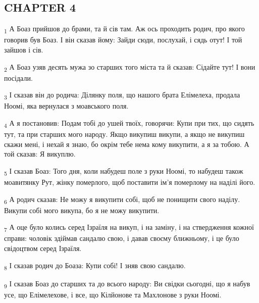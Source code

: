 \subsection{CHAPTER 4}
\begin{tcolorbox}
\textsubscript{1} А Боаз прийшов до брами, та й сів там. Аж ось проходить родич, про якого говорив був Боаз. І він сказав йому: Зайди сюди, послухай, і сядь отут! І той зайшов і сів.
\end{tcolorbox}
\begin{tcolorbox}
\textsubscript{2} А Боаз узяв десять мужа зо старших того міста та й сказав: Сідайте тут! І вони посідали.
\end{tcolorbox}
\begin{tcolorbox}
\textsubscript{3} І сказав він до родича: Ділянку поля, що нашого брата Елімелеха, продала Ноомі, яка вернулася з моавського поля.
\end{tcolorbox}
\begin{tcolorbox}
\textsubscript{4} А я постановив: Подам тобі до ушей твоїх, говорячи: Купи при тих, що сидять тут, та при старших мого народу. Якщо викупиш викупи, а якщо не викупиш скажи мені, і нехай я знаю, бо окрім тебе нема кому викупити, а я за тобою. А той сказав: Я викуплю.
\end{tcolorbox}
\begin{tcolorbox}
\textsubscript{5} І сказав Боаз: Того дня, коли набудеш поле з руки Ноомі, то набудеш також моавитянку Рут, жінку померлого, щоб поставити ім'я померлому на наділі його.
\end{tcolorbox}
\begin{tcolorbox}
\textsubscript{6} А родич сказав: Не можу я викупити собі, щоб не понищити свого наділу. Викупи собі мого викупа, бо я не можу викупити.
\end{tcolorbox}
\begin{tcolorbox}
\textsubscript{7} А оце було колись серед Ізраїля на викуп, і на заміну, і на ствердження кожної справи: чоловік здіймав сандалю свою, і давав своєму ближньому, і це було свідоцтвом серед Ізраїля.
\end{tcolorbox}
\begin{tcolorbox}
\textsubscript{8} І сказав родич до Боаза: Купи собі! І зняв свою сандалю.
\end{tcolorbox}
\begin{tcolorbox}
\textsubscript{9} І сказав Боаз до старших та до всього народу: Ви свідки сьогодні, що я набув усе, що Елімелехове, і все, що Кілйонове та Махлонове з руки Ноомі.
\end{tcolorbox}
